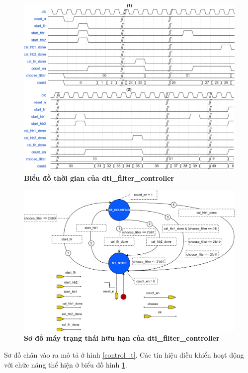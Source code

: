 \begin{figure}[H]
    \centering
    \includegraphics[width=13cm]{Images/Chuong4/hb_fir/control-timing.png}
    \caption[Biểu đồ thời gian của dti\_filter\_controller]{\bfseries \fontsize{12pt}{0pt}\selectfont Biểu đồ thời gian của dti\_filter\_controller}
    \label{control_timing}
\end{figure}
\begin{figure}[H]
    \centering
    \includegraphics[width=14cm]{Images/Chuong4/hb_fir/control-fsm.png}
    \caption[Sơ đồ máy trạng thái hữu hạn của dti\_filter\_controller]{\bfseries \fontsize{12pt}{0pt}\selectfont Sơ đồ máy trạng thái hữu hạn của dti\_filter\_controller}
    \label{control_fsm}
\end{figure}
Sơ đồ chân vào ra mô tả ở hình \ref{control_t}. Các tín hiệu điều khiển hoạt động với chức năng thể hiện ở biểu đồ hình \ref{control_timing}.

